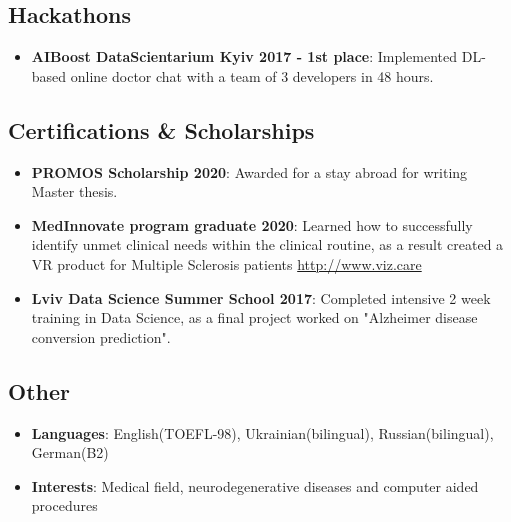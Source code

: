 \documentclass[11pt]{article}
\newcommand{\resumeSubItem}[2]{
  \item\small{
    \textbf{#1}{: #2 \vspace{-4pt}}
  }
}
\begin{document}
    \subsection*{Hackathons}
      \begin{itemize}
        \resumeSubItem{AIBoost DataScientarium Kyiv 2017 - 1st place}
          {Implemented DL-based online doctor chat with a team of 3 developers in 48 hours.}
        \vspace{-8pt}
      \end{itemize}
    \subsection*{Certifications \& Scholarships}
        \begin{itemize}
        	\resumeSubItem{PROMOS Scholarship 2020}{Awarded for a stay abroad for writing Master thesis.}
        	\resumeSubItem{MedInnovate program graduate 2020}{Learned how to successfully identify unmet clinical needs within the clinical routine, as a result created a VR product for Multiple Sclerosis patients \url{http://www.viz.care}}
            \resumeSubItem{Lviv Data Science Summer School 2017}{Completed intensive 2 week training in Data Science, as a final project worked on "Alzheimer disease conversion prediction".}
        \vspace{-8pt}
        \end{itemize}
    \subsection*{Other}
        \begin{itemize}
            \resumeSubItem{Languages}
              {English(TOEFL-98), Ukrainian(bilingual), Russian(bilingual), German(B2) }
            \resumeSubItem{Interests}{Medical field, neurodegenerative diseases and computer aided procedures}
        \end{itemize}
\end{document}

